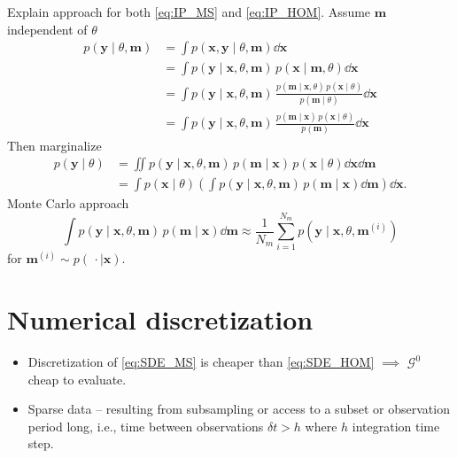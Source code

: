 \documentclass[10pt]{article}
\begin{document}
Explain approach for both \eqref{eq:IP_MS} and \eqref{eq:IP_HOM}.
Assume $\mathbf m$ independent of $\theta$
\begin{equation}
\begin{aligned}
	p(\mathbf y \mid \theta, \mathbf m) &= \int p(\mathbf x , \mathbf y \mid \theta, \mathbf m) \dd \mathbf x\\
	&= \int p(\mathbf y \mid \mathbf x, \theta, \mathbf m) \, p(\mathbf x \mid \mathbf m, \theta) \dd \mathbf x \\
	&= \int p(\mathbf y \mid \mathbf x, \theta, \mathbf m) \, \frac{p(\mathbf m\mid \mathbf x, \theta) \, p(\mathbf x \mid \theta)}{p(\mathbf m \mid \theta)} \dd \mathbf x\\
	&= \int p(\mathbf y \mid \mathbf x, \theta, \mathbf m) \, \frac{p(\mathbf m\mid \mathbf x) \, p(\mathbf x \mid \theta)}{p(\mathbf m)} \dd \mathbf x
\end{aligned}
\end{equation}
Then marginalize
\begin{equation}
\begin{aligned}
	p(\mathbf y \mid \theta) &= \iint p(\mathbf y \mid \mathbf x, \theta, \mathbf m) \, p(\mathbf m\mid \mathbf x) \, p(\mathbf x \mid \theta) \dd \mathbf x \dd \mathbf m\\
	&= \int p(\mathbf x \mid \theta) \left(\int p(\mathbf y \mid \mathbf x, \theta, \mathbf m) \, p(\mathbf m\mid \mathbf x) \dd \mathbf m \right) \dd \mathbf x.
\end{aligned}
\end{equation}
Monte Carlo approach
\begin{equation}
	\int p(\mathbf y \mid \mathbf x, \theta, \mathbf m) \, p(\mathbf m\mid \mathbf x) \dd \mathbf m \approx \frac{1}{N_m} \sum_{i=1}^{N_m} p(\mathbf y \mid \mathbf x, \theta, \mathbf m^{(i)})
\end{equation}
for $\mathbf m^{(i)} \sim p(\,\cdot \mid \mathbf x)$.
\section{Numerical discretization}

\begin{itemize}[label=-]
	\item Discretization of \eqref{eq:SDE_MS} is cheaper than \eqref{eq:SDE_HOM} $\implies$ $\mathcal G^0$ cheap to evaluate.
	\item Sparse data -- resulting from subsampling or access to a subset or observation period long, i.e., time between observations $\delta t > h$ where $h$ integration time step.
\end{itemize}
\end{document}
